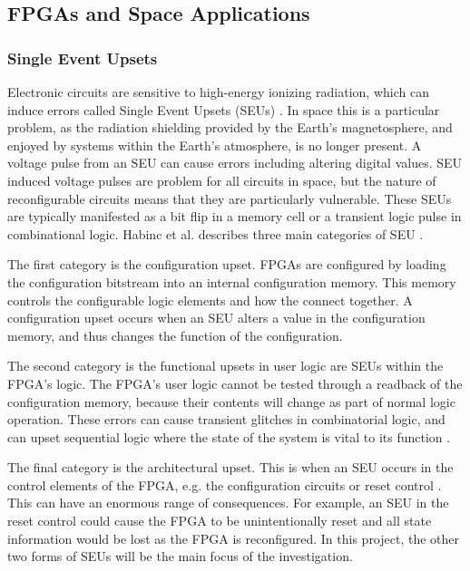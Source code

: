 \documentclass[12pt]{article}
\begin{document}
\subsection{FPGAs and Space Applications}
\label{sec:Background-FPGAsAndSpaceApplications}
\vspace{-12pt}

\subsubsection{Single Event Upsets}
\label{sec:Background-FPGAsAndSpaceApplications-SEUs}
\vspace{-12pt}

Electronic circuits are sensitive to high-energy ionizing radiation, which can induce errors called Single Event Upsets (SEUs) \cite{SeuTutorial}. In space this is a particular problem, as the radiation shielding provided by the Earth's magnetosphere, and enjoyed by systems within the Earth's atmosphere, is no longer present. A voltage pulse from an SEU can cause errors including altering digital values. SEU induced voltage pulses are problem for all circuits in space, but the nature of reconfigurable circuits means that they are particularly vulnerable. These SEUs are typically manifested as a bit flip in a memory cell or a transient logic pulse in combinational logic. Habinc et al. describes three main categories of SEU \cite{SuitabilityGaisler}.

The first category is the configuration upset. FPGAs are configured by loading the configuration bitstream into an internal configuration memory. This memory controls the configurable logic elements and how the connect together. A configuration upset occurs when an SEU alters a value in the configuration memory, and thus changes the function of the configuration. 

The second category is the functional upsets in user logic are SEUs within the FPGA's logic. The FPGA's user logic cannot be tested through a readback of the configuration memory, because their contents will change as part of normal logic operation. These errors can cause transient glitches in combinatorial logic, and can upset sequential logic where the state of the system is vital to its function \cite{FTripleMR}.

The final category is the architectural upset. This is when an SEU occurs in the control elements of the FPGA, e.g. the configuration circuits or reset control \cite{SuitabilityGaisler}. This can have an enormous range of consequences. For example, an SEU in the reset control could cause the FPGA to be unintentionally reset and all state information would be lost as the FPGA is reconfigured. In this project, the other two forms of SEUs will be the main focus of the investigation. 
\end{document}
